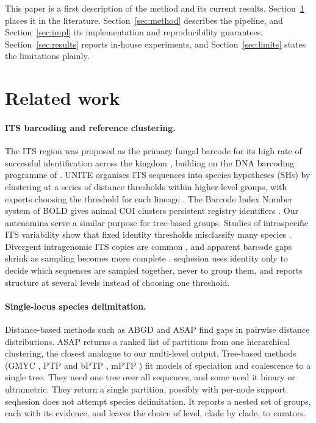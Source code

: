 \documentclass[11pt,a4paper]{article}
\newcommand{\seqhesion}{\textsf{seqhesion}}
\begin{document}
This paper is a first description of the method and its current results. Section~\ref{sec:related}
places it in the literature. Section~\ref{sec:method} describes the pipeline, and
Section~\ref{sec:impl} its implementation and reproducibility guarantees.
Section~\ref{sec:results} reports in-house experiments, and Section~\ref{sec:limits} states the
limitations plainly.

\section{Related work}\label{sec:related}

\paragraph{ITS barcoding and reference clustering.}
The ITS region was proposed as the primary fungal barcode for its high rate of successful
identification across the kingdom \citep{schoch2012its}, building on the DNA barcoding programme
of \citet{hebert2003barcoding}. UNITE organises ITS sequences into species hypotheses (SHs) by
clustering at a series of distance thresholds within higher-level groups, with experts choosing
the threshold for each lineage \citep{koljalg2013unite,abarenkov2024unite}. The Barcode Index
Number system of BOLD gives animal COI clusters persistent registry identifiers
\citep{ratnasingham2013bin}. Our antenomina serve a similar purpose for tree-based groups.
Studies of intraspecific ITS variability show that fixed identity thresholds misclassify many
species \citep{nilsson2008its,vu2019its,garnica2016cortinarius}. Divergent intragenomic ITS copies
are common \citep{bradshaw2023intragenomic}, and apparent barcode gaps shrink as sampling becomes
more complete \citep{meyer2005barcodegap}. \seqhesion{} uses identity only to decide which sequences
are sampled together, never to group them, and reports structure at several levels instead of
choosing one threshold.

\paragraph{Single-locus species delimitation.}
Distance-based methods such as ABGD \citep{puillandre2012abgd} and ASAP \citep{puillandre2021asap}
find gaps in pairwise distance distributions. ASAP returns a ranked list of partitions from one
hierarchical clustering, the closest analogue to our multi-level output. Tree-based methods (GMYC
\citep{pons2006gmyc,fujisawa2013gmyc}, PTP and bPTP \citep{zhang2013ptp}, mPTP \citep{kapli2017mptp})
fit models of speciation and coalescence to a single tree. They need one tree over all sequences,
and some need it binary or ultrametric. They return a single partition, possibly with per-node
support. \seqhesion{} does not attempt species delimitation. It reports a nested set of groups, each
with its evidence, and leaves the choice of level, clade by clade, to curators.
\end{document}
